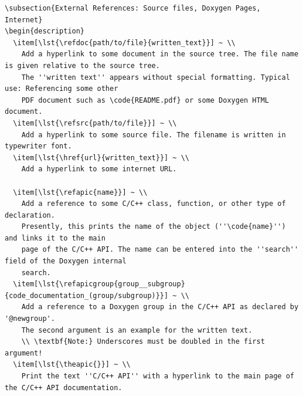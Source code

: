 \documentclass[12pt,english,parskip=half,headheight=19pt]{scrreprt}
\renewenvironment{description}[1][8ex]
  {\list{}{\labelwidth=5ex \leftmargin=#1 \let\makelabel\descriptionlabel}}
  {\endlist}
\newcommand{\lst}[1]{\colorbox{lstbackground}{\footnotesize\code{#1}}}
\newcommand{\refdoc}[2]{\href{#1}{#2}}              %
\newcommand{\refsrc}[1]{\href{#1}{\texttt{#1}}}     %
\newcommand{\refapic}[1]{\href{home2l-api_c/index.html}{\mbox{\texttt{#1}}}}            %
\newcommand{\refapicgroup}[2]{\href{home2l-api_c/group__#1.html}{#2}}
\newcommand{\theapic}{\refdoc{home2l-api_c/index.html}{C/C++ API}}
\begin{document}
\begin{description}
{\begin{lstlisting}[language=<language>]
% External references (Doxygen and sources) ...
\subsection{External References: Source files, Doxygen Pages, Internet}
\begin{description}
  \item[\lst{\refdoc{path/to/file}{written_text}}] ~ \\
    Add a hyperlink to some document in the source tree. The file name is given relative to the source tree.
    The ''written text'' appears without special formatting. Typical use: Referencing some other
    PDF document such as \code{README.pdf} or some Doxygen HTML document.
  \item[\lst{\refsrc{path/to/file}}] ~ \\
    Add a hyperlink to some source file. The filename is written in typewriter font.
  \item[\lst{\href{url}{written_text}}] ~ \\
    Add a hyperlink to some internet URL.

  \item[\lst{\refapic{name}}] ~ \\
    Add a reference to some C/C++ class, function, or other type of declaration.
    Presently, this prints the name of the object (''\code{name}'') and links it to the main
    page of the C/C++ API. The name can be entered into the ''search'' field of the Doxygen internal
    search.
  \item[\lst{\refapicgroup{group__subgroup}{code_documentation_(group/subgroup)}}] ~ \\
    Add a reference to a Doxygen group in the C/C++ API as declared by '@newgroup'.
    The second argument is an example for the written text.
    \\ \textbf{Note:} Underscores must be doubled in the first argument!
  \item[\lst{\theapic{}}] ~ \\
    Print the text ''C/C++ API'' with a hyperlink to the main page of the C/C++ API documentation.


\end{lstlisting}}
\end{description}
\end{document}

